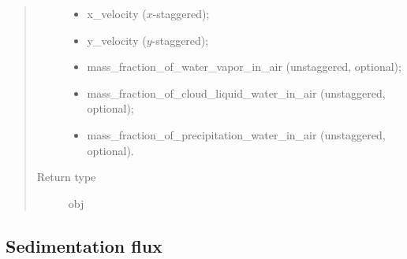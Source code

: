 \documentclass[letterpaper,10pt,english]{sphinxmanual}
\begin{document}
\begin{fulllineitems}
\begin{fulllineitems}
\begin{quote}
\begin{description}
\begin{itemize}
\item {} 
x\_velocity (\(x\)-staggered);

\item {} 
y\_velocity (\(y\)-staggered);

\item {} 
mass\_fraction\_of\_water\_vapor\_in\_air (unstaggered, optional);

\item {} 
mass\_fraction\_of\_cloud\_liquid\_water\_in\_air (unstaggered, optional);

\item {} 
mass\_fraction\_of\_precipitation\_water\_in\_air (unstaggered, optional).

\end{itemize}


\item[{Return type}] \leavevmode
obj

\end{description}\end{quote}

\end{fulllineitems}


\end{fulllineitems}



\subsection{Sedimentation flux}
\label{\detokenize{api:sedimentation-flux}}
\end{document}
